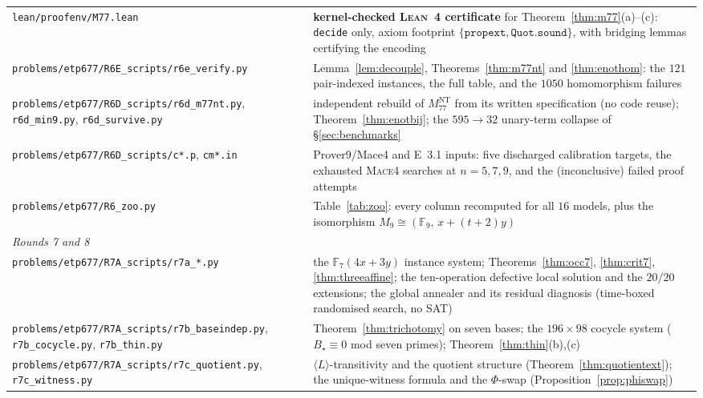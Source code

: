\documentclass[11pt]{article}
\theoremstyle{plain}
\theoremstyle{definition}
\theoremstyle{remark}
\numberwithin{equation}{section}
\newcommand{\F}{\mathbb{F}}
\begin{document}
\begin{longtable}{p{}p{}}
\texttt{lean\slash proofenv\slash M77.lean} & \textbf{kernel-checked \textsc{Lean}~4
certificate} for Theorem~\ref{thm:m77}(a)--(c): \texttt{decide} only, axiom footprint
$\{\texttt{propext},\texttt{Quot.sound}\}$, with bridging lemmas certifying the encoding\\
\texttt{problems\slash etp677\slash R6E\_scripts\slash r6e\_verify.py} &
Lemma~\ref{lem:decouple}, Theorems~\ref{thm:m77nt} and \ref{thm:enothom}: the $121$
pair-indexed instances, the full table, and the $1050$ homomorphism failures\\
\texttt{problems\slash etp677\slash R6D\_scripts\slash r6d\_m77nt.py},\newline
\texttt{r6d\_min9.py}, \texttt{r6d\_survive.py} & independent rebuild of
$M_{77}^{\mathrm{NT}}$ from its written specification (no code reuse);
Theorem~\ref{thm:enotbij}; the $595\to32$ unary-term collapse of
\S\ref{sec:benchmarks}\\
\texttt{problems\slash etp677\slash R6D\_scripts\slash c*.p}, \texttt{cm*.in} &
Prover9/Mace4 and E~3.1 inputs: five discharged calibration targets, the exhausted
\textsc{Mace4} searches at $n = 5,7,9$, and the (inconclusive) failed proof attempts\\
\texttt{problems\slash etp677\slash R6\_zoo.py} & Table~\ref{tab:zoo}: every column
recomputed for all $16$ models, plus the isomorphism $M_9\cong(\F_9,\,x+(t+2)y)$\\
\midrule
\multicolumn{2}{l}{\emph{Rounds 7 and 8}}\\
\midrule
\texttt{problems\slash etp677\slash R7A\_scripts\slash r7a\_*.py} & the $\F_7(4x+3y)$
instance system; Theorems~\ref{thm:occ7}, \ref{thm:crit7}, \ref{thm:threeaffine}; the
ten-operation defective local solution and the $20/20$ extensions; the global annealer and
its residual diagnosis (time-boxed randomised search, no SAT)\\
\texttt{problems\slash etp677\slash R7A\_scripts\slash r7b\_baseindep.py},\newline
\texttt{r7b\_cocycle.py}, \texttt{r7b\_thin.py} & Theorem~\ref{thm:trichotomy} on seven
bases; the $196\times98$ cocycle system ($B_\star\equiv0$ mod seven primes);
Theorem~\ref{thm:thin}(b),(c)\\
\texttt{problems\slash etp677\slash R7A\_scripts\slash r7c\_quotient.py},\newline
\texttt{r7c\_witness.py} & $\langle L\rangle$-transitivity and the quotient structure
(Theorem~\ref{thm:quotientext}); the unique-witness formula and the $\Phi$-swap
(Proposition~\ref{prop:phiswap})\\

\end{longtable}
\end{document}
